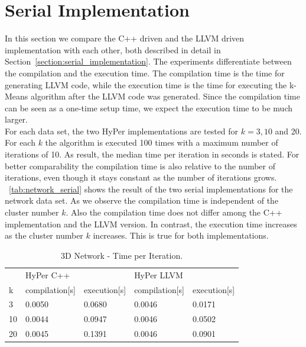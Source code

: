 \section{Serial Implementation}\label{section:serial}

In this section we compare the C++ driven and the LLVM driven implementation with each other, both described in detail in Section~\ref{section:serial_implementation}. The experiments differentiate between the compilation and the execution time. The compilation time is the time for generating LLVM code, while the execution time is the time for executing the k-Means algorithm after the LLVM code was generated. Since the compilation time can be seen as a one-time setup time, we expect the execution time to be much larger. 
\\
For each data set, the two HyPer implementations are tested for $k = 3,10$ and 20. For each $k$ the algorithm is executed 100 times with a maximum number of iterations of 10. As result, the median time per iteration in seconds is stated. For better comparability the compilation time is also relative to the number of iterations, even though it stays constant as the number of iterations grows.
\\
~\autoref{tab:network_serial} shows the result of the two serial implementations for the network data set. As we observe the compilation time is independent of the cluster number $k$. Also the compilation time does not differ among the C++ implementation and the LLVM version. In contrast, the execution time increases as the cluster number $k$ increases. This is true for both implementations. 

\begin{table}[htsb]
  \caption[3D Network - Time per Iteration]{3D Network - Time per Iteration.}\label{tab:network_serial}
  \centering
  \begin{tabular}{l l l l l}
    \toprule
      & HyPer C++ & & HyPer LLVM & \\
      k & compilation[s] & execution[s] & compilation[s] & execution[s] \\
    \midrule
      3 & 0.0050 & 0.0680 & 0.0046 & 0.0171 \\
      10 & 0.0044 & 0.0947 & 0.0046 & 0.0502 \\
      20 & 0.0045 & 0.1391 & 0.0046 & 0.0901 \\
    \bottomrule
  \end{tabular}
\end{table}


